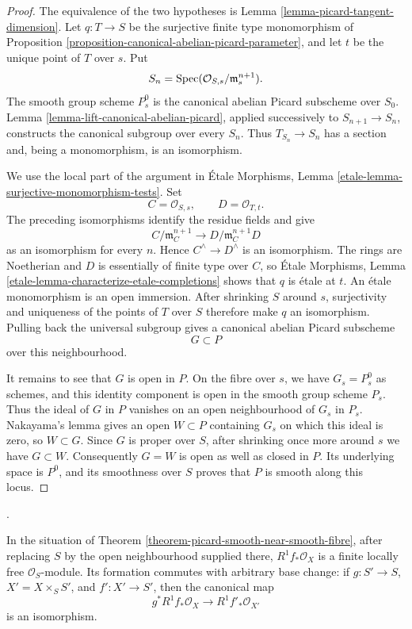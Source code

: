 \begin{proof}
The equivalence of the two hypotheses is Lemma
\ref{lemma-picard-tangent-dimension}. Let $q : T \to S$ be the surjective
finite type monomorphism of Proposition
\ref{proposition-canonical-abelian-picard-parameter}, and let $t$ be the unique
point of $T$ over $s$. Put
$$
S_n=\mathop{\mathrm{Spec}}(\mathcal{O}_{S,s}/\mathfrak m_s^{n+1}).
$$
The smooth group scheme $P_s^0$ is the canonical abelian Picard subscheme over
$S_0$. Lemma \ref{lemma-lift-canonical-abelian-picard}, applied successively
to $S_{n+1} \to S_n$, constructs the canonical subgroup over every $S_n$.
Thus $T_{S_n} \to S_n$ has a section and, being a monomorphism, is an
isomorphism.

We use the local part of the argument in \'Etale Morphisms, Lemma
\ref{etale-lemma-surjective-monomorphism-tests}. Set
$$
C=\mathcal{O}_{S,s}, \qquad D=\mathcal{O}_{T,t}.
$$
The preceding isomorphisms identify the residue fields and give
$$
C/\mathfrak m_C^{n+1}
\longrightarrow D/\mathfrak m_C^{n+1}D
$$
as an isomorphism for every $n$. Hence $C^\wedge \to D^\wedge$ is an
isomorphism. The rings are Noetherian and $D$ is essentially of finite type
over $C$, so \'Etale Morphisms, Lemma
\ref{etale-lemma-characterize-etale-completions} shows that $q$ is \'etale at
$t$. An \'etale monomorphism is an open immersion. After shrinking $S$ around
$s$, surjectivity and uniqueness of the points of $T$ over $S$ therefore make
$q$ an isomorphism. Pulling back the universal subgroup gives a canonical
abelian Picard subscheme
$$
G \subset P
$$
over this neighbourhood.

It remains to see that $G$ is open in $P$. On the fibre over $s$, we have
$G_s=P_s^0$ as schemes, and this identity component is open in the smooth
group scheme $P_s$. Thus the ideal of $G$ in $P$ vanishes on an open
neighbourhood of $G_s$ in $P_s$. Nakayama's lemma gives an open $W \subset P$
containing $G_s$ on which this ideal is zero, so $W \subset G$. Since $G$ is
proper over $S$, after shrinking once more around $s$ we have $G \subset W$.
Consequently $G=W$ is open as well as closed in $P$. Its underlying space is
$P^0$, and its smoothness over $S$ proves that $P$ is smooth along this locus.
\end{proof}

\begin{lemma}
\label{corollary-picard-R1-locally-free-base-change}
\begin{reference}
\cite[Expos\'e 236, Corollary 3.6, p. 240]{FGA}.
\end{reference}
In the situation of Theorem
\ref{theorem-picard-smooth-near-smooth-fibre}, after replacing $S$ by the open
neighbourhood supplied there, $R^1f_*\mathcal{O}_X$ is a finite locally free
$\mathcal{O}_S$-module. Its formation commutes with arbitrary base change: if
$g : S' \to S$, $X'=X\times_S S'$, and $f' : X' \to S'$, then the canonical
map
$$
g^*R^1f_*\mathcal{O}_X \longrightarrow R^1f'_*\mathcal{O}_{X'}
$$
is an isomorphism.
\end{lemma}

